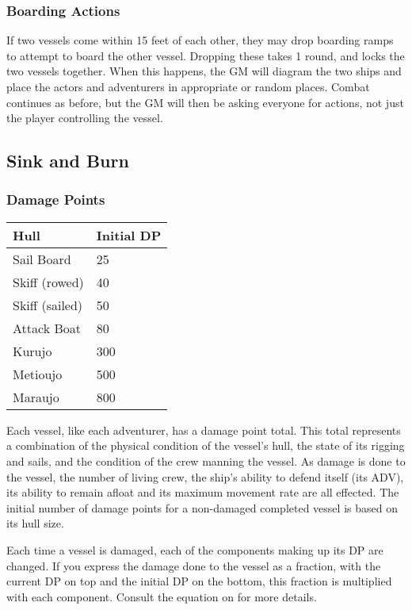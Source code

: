 \subsubsection{Boarding Actions}
If two vessels come within 15 feet of each other, they may drop boarding ramps to attempt to board the other vessel. Dropping these takes 1 round, and locks the two vessels together. When this happens, the GM will diagram the two ships and place the actors and adventurers in appropriate or random places. Combat continues as before, but the GM will then be asking everyone for actions, not just the player controlling the vessel.
\subsection{Sink and Burn}
\subsubsection{Damage Points}

\begin{normbox}[Hull DP]
\small
\begin{tabular}{@{}ll}
Hull & Initial DP\\
\midrule
Sail Board & 25\\
Skiff (rowed) & 40\\
Skiff (sailed) & 50\\
Attack Boat & 80\\
Kurujo & 300\\
Metioujo & 500\\
Maraujo & 800\\
\end{tabular}
\end{normbox}

Each vessel, like each adventurer, has a damage point total. This total represents a combination of the physical condition of the vessel's hull, the state of its rigging and sails, and the condition of the crew manning the vessel. As damage is done to the vessel, the number of living crew, the ship's ability to defend itself (its ADV), its ability to remain afloat and its maximum movement rate are all effected. The initial number of damage points for a non-damaged completed vessel is based on its hull size.

Each time a vessel is damaged, each of the components making up its DP are changed. If you express the damage done to the vessel as a fraction, with the current DP on top and the initial DP on the bottom, this fraction is multiplied with each component. Consult the equation on  for more details.

